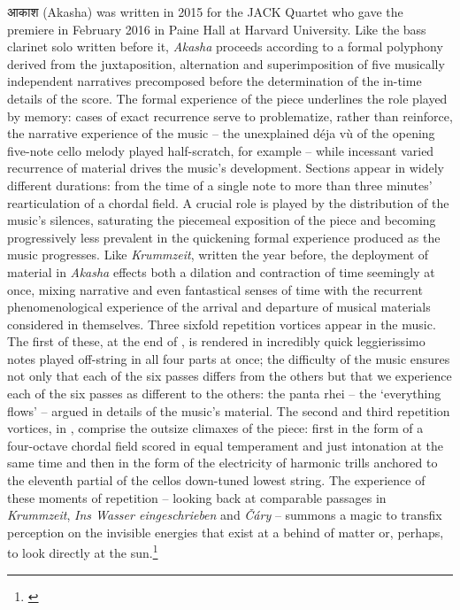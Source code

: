 {\hindifont आकाश} (Akasha) was written in 2015 for the JACK Quartet who gave the premiere in February 2016 in Paine Hall at Harvard University. Like the bass clarinet solo written before it, \textit{Akasha} proceeds according to a formal polyphony derived from the juxtaposition, alternation and superimposition of five musically independent narratives precomposed before the determination of the in-time details of the score. The formal experience of the piece underlines the role played by memory: cases of exact recurrence serve to problematize, rather than reinforce, the narrative experience of the music -- the unexplained d\'eja v\`u of the opening five-note cello melody played half-scratch, for example -- while incessant varied recurrence of material drives the music’s development. Sections appear in widely different durations: from the time of a single note to more than three minutes’ rearticulation of a chordal field. A crucial role is played by the distribution of the music’s silences, saturating the piecemeal exposition of the piece and becoming progressively less prevalent in the quickening formal experience produced as the music progresses. Like \textit{Krummzeit}, written the year before, the deployment of material in \textit{Akasha} effects both a dilation and contraction of time seemingly at once, mixing narrative and even fantastical senses of time with the recurrent phenomenological experience of the arrival and departure of musical materials considered in themselves. Three sixfold repetition vortices appear in the music. The first of these, at the end of , is rendered in incredibly quick leggierissimo notes played off-string in all four parts at once; the difficulty of the music ensures not only that each of the six passes differs from the others but that we experience each of the six passes as different to the others: the panta rhei -- the `everything flows' -- argued in details of the music’s material. The second and third repetition vortices, in , comprise the outsize climaxes of the piece: first in the form of a four-octave chordal field scored in equal temperament and just intonation at the same time and then in the form of the electricity of harmonic trills anchored to the eleventh partial of the cellos down-tuned lowest string. The experience of these moments of repetition -- looking back at comparable passages in \textit{Krummzeit}, \textit{Ins Wasser eingeschrieben} and \textit{\v{C}\'ary} -- summons a magic to transfix perception on the invisible energies that exist at a behind of matter or, perhaps, to look directly at the sun.\footnote{\citet{baca-dissertation}}

